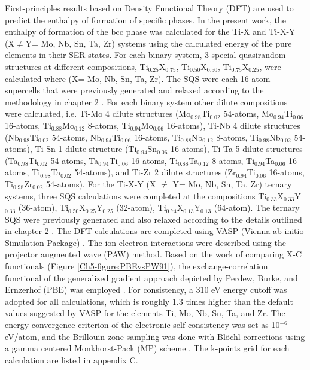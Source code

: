 First-principles results based on Density Functional Theory (DFT) are used to predict the enthalpy of formation of specific phases. In the present work, the enthalpy of formation of the bcc phase was calculated for the Ti-X and Ti-X-Y (X$\neq$Y= Mo, Nb, Sn, Ta, Zr) systems using the calculated energy of the pure elements in their SER states. For each binary system, 3 special quasirandom structures at different compositions, Ti$_{0.25}$X$_{0.75}$, Ti$_{0.50}$X$_{0.50}$, Ti$_{0.75}$X$_{0.25}$, were calculated where (X= Mo, Nb, Sn, Ta, Zr). The SQS were each 16-atom supercells that were previously generated and relaxed according to the methodology in chapter 2 \cite{Jiang2004}. For each binary system other dilute compositions were calculated, i.e. Ti-Mo 4 dilute structures (Mo$_{0.98}$Ti$_{0.02}$ 54-atoms, Mo$_{0.94}$Ti$_{0.06}$ 16-atoms,  Ti$_{0.88}$Mo$_{0.12}$ 8-atoms, Ti$_{0.94}$Mo$_{0.06}$ 16-atoms), Ti-Nb 4 dilute structures (Nb$_{0.98}$Ti$_{0.02}$ 54-atoms, Nb$_{0.94}$Ti$_{0.06}$ 16-atoms, Ti$_{0.88}$Nb$_{0.12}$ 8-atoms, Ti$_{0.98}$Nb$_{0.02}$ 54-atoms), Ti-Sn 1 dilute structure (Ti$_{0.94}$Sn$_{0.06}$ 16-atoms), Ti-Ta 5 dilute structures (Ta$_{0.98}$Ti$_{0.02}$ 54-atoms, Ta$_{0.94}$Ti$_{0.06}$ 16-atoms, Ti$_{0.88}$Ta$_{0.12}$ 8-atoms, Ti$_{0.94}$Ta$_{0.06}$ 16-atoms, Ti$_{0.98}$Ta$_{0.02}$ 54-atoms), and Ti-Zr 2 dilute structures (Zr$_{0.94}$Ti$_{0.06}$ 16-atoms, Ti$_{0.98}$Zr$_{0.02}$ 54-atoms). For the Ti-X-Y (X $\neq$ Y= Mo, Nb, Sn, Ta, Zr) ternary systems, three SQS calculations were completed at the compositions Ti$_{0.33}$X$_{0.33}$Y$_{0.33}$ (36-atom), Ti$_{0.50}$X$_{0.25}$Y$_{0.25}$ (32-atom), Ti$_{0.74}$X$_{0.13}$Y$_{0.13}$ (64-atom). The ternary SQS were previously generated and also relaxed according to the details outlined in chapter 2 \cite{Jiang2009}. The DFT calculations are completed using VASP (Vienna ab-initio Simulation Package) \cite{Kresse1996}. The ion-electron interactions were described using the projector augmented wave (PAW) \cite{Kresse1999,Blochl1994} method. Based on the work of comparing X-C functionals (Figure \ref{Ch5-figure:PBEvsPW91}), the exchange-correlation functional of the generalized gradient approach depicted by Perdew, Burke, and Ernzerhof (PBE) was employed \cite{Perdew1996a}. For consistency, a 310 eV energy cutoff was adopted for all calculations, which is roughly 1.3 times higher than the default values suggested by VASP for the elements Ti, Mo, Nb, Sn, Ta, and Zr. The energy convergence criterion of the electronic self-consistency was set as 10$^{-6}$ eV/atom, and the Brillouin zone sampling was done with Bl\"ochl corrections \cite{Blochl1994} using a gamma centered Monkhorst-Pack (MP) scheme \cite{Kresse1996,Monkhorst1976a}. The k-points grid for each calculation are listed in appendix C.

